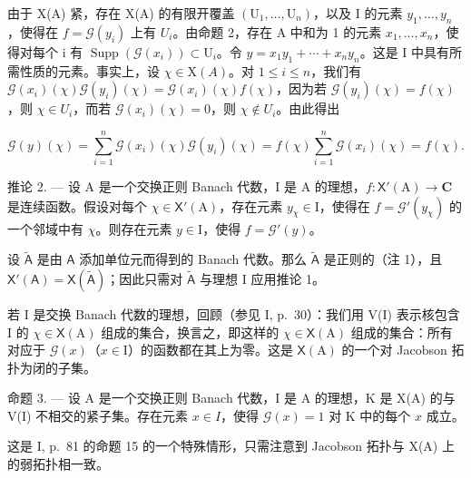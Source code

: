 由于 X(A) 紧，存在 X(A) 的有限开覆盖 \((\mathrm{U}_{1},\ldots,\mathrm{U}_{n})\)，以及 I 的元素 \(y_{1},\ldots,y_{n}\)，使得在 \(f=\mathcal{G}(y_{i})\) 上有 \(U_{i}\)。由命题 2，存在 A 中和为 1 的元素 \(x_{1},\ldots,x_{n}\)，使得对每个 i 有 \(\operatorname{Supp}(\mathcal{G}(x_{i}))\subset\mathrm{U}_{i}\)。令 \(y=x_{1}y_{1}+\cdots+x_{n}y_{n}\)。这是 I 中具有所需性质的元素。事实上，设 \(\chi\in\mathrm{X}(A)\)。对 \(1\leqslant i\leqslant n\)，我们有 \(\mathcal{G}(x_{i})(\chi)\mathcal{G}(y_{i})(\chi)=\mathcal{G}(x_{i})(\chi)f(\chi)\)，因为若 \(\mathcal{G}(y_{i})(\chi)=f(\chi)\)，则 \(\chi\in U_{i}\)，而若 \(\mathcal{G}(x_{i})(\chi)=0\)，则 \(\chi\notin U_{i}\)。由此得出

\[
\mathcal {G} (y) (\chi) = \sum_ {i = 1} ^ {n} \mathcal {G} (x _ {i}) (\chi) \mathcal {G} (y _ {i}) (\chi) = f (\chi) \sum_ {i = 1} ^ {n} \mathcal {G} (x _ {i}) (\chi) = f (\chi).
\]

推论 2. --- 设 A 是一个交换正则 Banach 代数，I 是 A 的理想，\(f\colon\mathsf{X}'(\mathrm{A})\to\mathbf{C}\) 是连续函数。假设对每个 \(\chi\in\mathsf{X}'(\mathrm{A})\)，存在元素 \(y_{\chi}\in\mathrm{I}\)，使得在 \(f=\mathcal{G}'(y_{\chi})\) 的一个邻域中有 \(\chi\)。则存在元素 \(y\in\mathrm{I}\)，使得 \(f=\mathcal{G}'(y)\)。

设 \(\tilde{\mathsf{A}}\) 是由 \(\mathsf{A}\) 添加单位元而得到的 Banach 代数。那么 \(\tilde{\mathsf{A}}\) 是正则的（注 1），且 \(\mathsf{X}'(\mathsf{A}) = \mathsf{X}(\widetilde{\mathsf{A}})\)；因此只需对 \(\tilde{\mathsf{A}}\) 与理想 I 应用推论 1。

若 I 是交换 Banach 代数的理想，回顾（参见 I, p.~30）：我们用 V(I) 表示核包含 I 的 \(\chi \in \mathsf{X}(\mathrm{A})\) 组成的集合，换言之，即这样的 \(\chi \in \mathsf{X}(\mathrm{A})\) 组成的集合：所有对应于 \(\mathcal{G}(x)\)（\(x \in \mathrm{I}\)）的函数都在其上为零。这是 \(\mathsf{X}(\mathrm{A})\) 的一个对 Jacobson 拓扑为闭的子集。

命题 3. --- 设 A 是一个交换正则 Banach 代数，I 是 A 的理想，K 是 X(A) 的与 V(I) 不相交的紧子集。存在元素 \(x \in I\)，使得 \(\mathcal{G}(x) = 1\) 对 K 中的每个 \(x\) 成立。

这是 I, p.~81 的命题 15 的一个特殊情形，只需注意到 Jacobson 拓扑与 X(A) 上的弱拓扑相一致。
\relax{}
